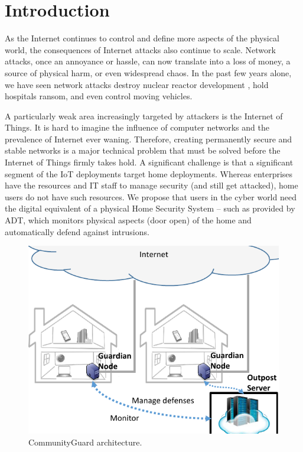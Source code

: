 \section{Introduction}
\label{sec:intro}

As the Internet continues to control and define more aspects of the physical world, the consequences of Internet attacks also continue to scale. Network attacks, once an annoyance or hassle, can now translate into a loss of money, a source of physical harm, or even widespread chaos. In the past few years alone, we have seen network attacks destroy nuclear reactor development \cite{stux}, hold hospitals ransom\cite{ransom}, and even control moving vehicles\cite{carhack}. 

A particularly weak area increasingly targeted by attackers is the Internet of Things. It is hard to imagine the influence of computer networks and the prevalence of Internet ever waning. Therefore, creating permanently secure and stable networks is a major technical problem that must be solved before the Internet of Things firmly takes hold. A significant challenge is that a significant segment of the IoT deployments target home deployments.  Whereas enterprises have the resources and IT staff to manage security (and still get attacked), home users do not have such resources.  We propose that users in the cyber world need the digital equivalent of a physical Home Security System -- such as provided by ADT, which monitors physical aspects (\eg door open) of the home and automatically defend against intrusions. 



\begin{figure}
    \centering
    \includegraphics[width=0.95\columnwidth]{figs/highlevel.pdf}
    \caption{CommunityGuard architecture.}
    \label{fig:arch}
\end{figure}



